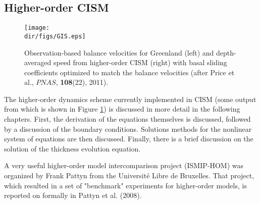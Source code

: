 \subsection{Higher-order CISM}

\begin{figure}
  \begin{center}
    \texttt{[image: \\dir/figs/GIS.eps]}
   \end{center}
  \caption{Observation-based balance velocities for Greenland (left) and depth-averaged speed from higher-order CISM (right) with basal sliding coefficients optimized to match the balance velocities (after Price et al., $PNAS$, \textbf{108}(22), 2011).}
  \label{fig:GIS_PNAS}
\end{figure} 

The higher-order dynamics scheme currently implemented in CISM (some output from which is shown in Figure \ref{fig:GIS_PNAS}) is discussed in more detail in the following chapters. First, the derivation of the equations themselves is discussed, followed by a discussion of the boundary conditions. Solutions methods for the nonlinear system of equations are then discussed. Finally, there is a brief discussion on the solution of the thickness evolution equation. 

A very useful higher-order model intercomparison project (ISMIP-HOM) was organized by Frank Pattyn from the Université Libre de Bruxelles. That project, which resulted in a set of "benchmark" experiments for higher-order models, is reported on formally in Pattyn et al. (2008). 

%